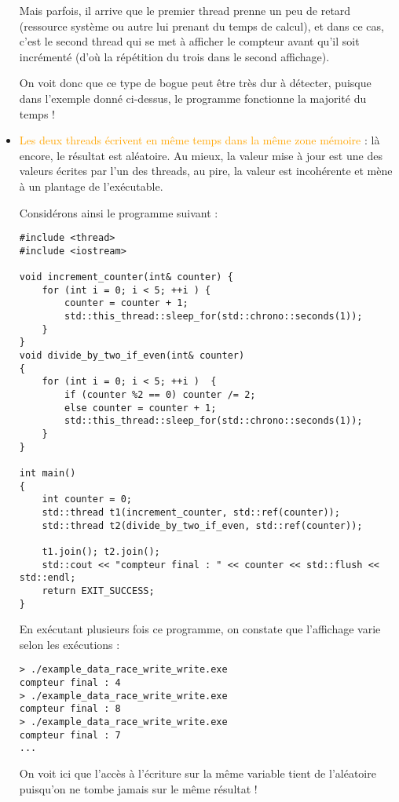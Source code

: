 \documentclass[fleqn,11pt]{article}
\begin{document}
\begin{itemize}
Mais parfois, il arrive que le premier thread prenne un peu de retard (ressource système ou autre lui prenant du temps de calcul), et dans ce cas, c'est le second thread qui se met à afficher le compteur avant qu'il soit
incrémenté (d'où la répétition du trois dans le second affichage).

On voit donc que ce type de bogue peut être très dur à détecter, puisque dans l'exemple donné ci-dessus,
le programme fonctionne la majorité du temps !

\item \textcolor{orange}{Les deux threads écrivent en même temps dans la même zone mémoire} : là encore, le résultat est aléatoire. Au mieux, la valeur mise à jour est une des valeurs écrites par l'un des threads, au pire, la valeur est incohérente et mène à un plantage de l'exécutable.

Considérons ainsi le programme suivant :
\begin{lstlisting}
#include <thread>
#include <iostream>

void increment_counter(int& counter) {
    for (int i = 0; i < 5; ++i ) {
        counter = counter + 1;
        std::this_thread::sleep_for(std::chrono::seconds(1));
    }
}
void divide_by_two_if_even(int& counter)
{
    for (int i = 0; i < 5; ++i )  {
        if (counter %2 == 0) counter /= 2;
        else counter = counter + 1;
        std::this_thread::sleep_for(std::chrono::seconds(1));
    }
}

int main()
{
    int counter = 0;
    std::thread t1(increment_counter, std::ref(counter));
    std::thread t2(divide_by_two_if_even, std::ref(counter));

    t1.join(); t2.join();
    std::cout << "compteur final : " << counter << std::flush << std::endl;
    return EXIT_SUCCESS;    
}
\end{lstlisting}
En exécutant plusieurs fois ce programme, on constate que l'affichage varie selon les exécutions :
\begin{verbatim}
> ./example_data_race_write_write.exe
compteur final : 4
> ./example_data_race_write_write.exe
compteur final : 8
> ./example_data_race_write_write.exe
compteur final : 7
...
\end{verbatim}

On voit ici que l'accès à l'écriture sur la même variable tient de l'aléatoire puisqu'on ne tombe jamais sur le même résultat !
\end{itemize}
\end{document}
